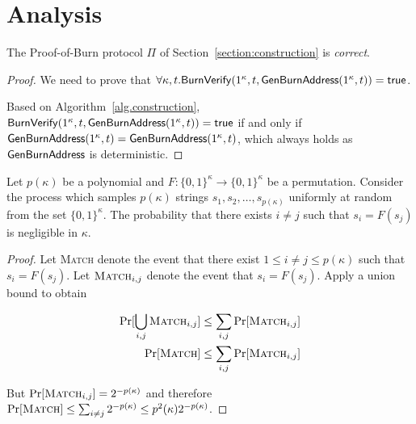 \section{Analysis}

\begin{theorem}[Correctness]
  The Proof-of-Burn protocol $\Pi$ of Section~\ref{section:construction} is \emph{correct}.
\end{theorem}
\begin{proof}
  We need to prove that $\forall \kappa, t. \mathsf{BurnVerify}(1^\kappa, t, \mathsf{GenBurnAddress}(1^\kappa, t)) = \textsf{true}$.

  Based on Algorithm~\ref{alg.construction}, $\mathsf{BurnVerify}(1^\kappa, t, \mathsf{GenBurnAddress}(1^\kappa, t)) = \textsf{true}$ if and only if $\mathsf{GenBurnAddress}(1^\kappa, t) = \mathsf{GenBurnAddress}(1^\kappa, t)$, which always holds as $\mathsf{GenBurnAddress}$ is deterministic.
\end{proof}

\begin{lemma}[Perturbation]
  \label{lem.perturbation}
  Let $p(\kappa)$ be a polynomial and
  $F: \{0,1\}^\kappa \longrightarrow \{0,1\}^\kappa$ be a permutation.
  Consider the process which samples $p(\kappa)$ strings $s_1, s_2, \dots, s_{p(\kappa)}$ uniformly at random from the set $\{0, 1\}^\kappa$. The probability that there exists $i \neq j$ such that $s_i = F(s_j)$ is negligible in $\kappa$.
\end{lemma}
\begin{proof}
  Let \textsc{Match} denote the event that there exist $1 \leq i \neq j \leq p(\kappa)$ such that $s_i = F(s_j)$.
  Let $\textsc{Match}_{i, j}$ denote the event that $s_i = F(s_j)$. Apply a union bound to obtain

  \begin{align*}
    \Pr[\bigcup_{i, j}\textsc{Match}_{i, j}] &\leq \sum_{i, j} \Pr[\textsc{Match}_{i, j}] \\
    \Pr[\textsc{Match}] &\leq \sum_{i, j} \Pr[\textsc{Match}_{i, j}]
  \end{align*}

  But $\Pr[\textsc{Match}_{i, j}] = 2^{-p(\kappa)}$ and therefore
  $\Pr[\textsc{Match}] \leq \sum_{i \neq j} 2^{-p(\kappa)} \leq p^2(\kappa) 2^{-p(\kappa)}$.
\end{proof}

